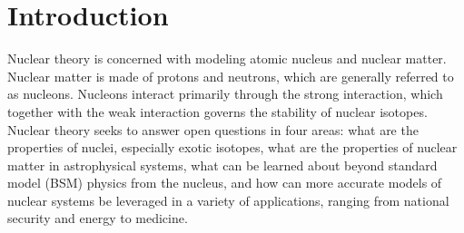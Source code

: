 \chapter{Introduction}



Nuclear theory is concerned with modeling atomic nucleus and nuclear matter. Nuclear matter is made of protons and neutrons, which are generally referred to as nucleons. Nucleons interact primarily through the strong interaction, which together with the weak interaction governs the stability of nuclear isotopes. Nuclear theory seeks to answer open questions in four areas: what are the properties of nuclei, especially exotic isotopes, what are the properties of nuclear matter in astrophysical systems, what can be learned about beyond standard model (BSM) physics from the nucleus, and how can more accurate models of nuclear systems be leveraged in a variety of applications, ranging from national security and energy to medicine.

